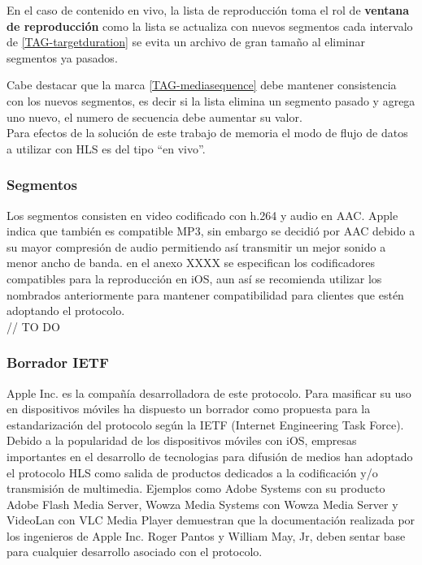 En el caso de contenido en vivo, la lista de reproducción toma el rol de \textbf{ventana de reproducción}  como la lista se actualiza con nuevos segmentos cada intervalo de \ref{TAG-targetduration} se evita un archivo de gran tamaño al eliminar segmentos ya pasados.

Cabe destacar que la marca \ref{TAG-mediasequence} debe mantener consistencia con los nuevos segmentos, es decir si la lista elimina un segmento pasado y agrega uno nuevo, el numero de secuencia debe aumentar su valor.\\

Para efectos de la solución de este trabajo de memoria el modo de flujo de datos a utilizar con HLS es del tipo ``en vivo''.
\subsubsection{Segmentos}
Los segmentos consisten en video codificado con h.264 y audio en AAC. Apple indica que también es compatible MP3, sin embargo se decidió por AAC debido a su mayor compresión de audio permitiendo así transmitir un mejor sonido a menor ancho de banda. en el anexo XXXX se especifican los codificadores compatibles para la reproducción en iOS, aun así se recomienda utilizar los nombrados anteriormente para mantener compatibilidad para clientes que estén adoptando el protocolo.\\

// TO DO
\subsubsection{Borrador IETF}
Apple Inc. es la compañía desarrolladora de este protocolo. Para masificar su uso en dispositivos móviles ha dispuesto un borrador como propuesta para la estandarización del protocolo según la IETF (Internet Engineering Task Force).
Debido a la popularidad de los dispositivos móviles con iOS, empresas importantes en el desarrollo de tecnologias para difusión de medios han adoptado el protocolo HLS como salida de productos dedicados a la codificación y/o transmisión de multimedia. Ejemplos como Adobe Systems con su producto Adobe Flash Media Server, Wowza Media Systems con Wowza Media Server y VideoLan con VLC Media Player demuestran que la documentación realizada por los ingenieros de Apple Inc. Roger Pantos y William May, Jr, deben sentar base para cualquier desarrollo asociado con el protocolo.\\

